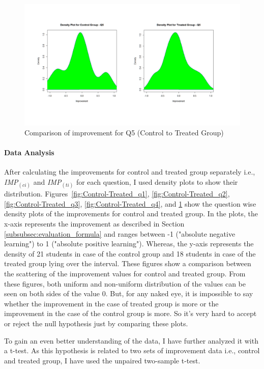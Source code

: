 \begin{figure}
	\centering
	\includegraphics[width=1\textwidth]{figures/Control-Treated_q5}
	\caption{Comparison of improvement for Q5 (Control to Treated Group)}
	\label{fig:Control-Treated_q5}
\end{figure}

\paragraph{Data Analysis}
After calculating the improvements for control and treated group separately i.e., \textit{IMP$_{(ci)}$} and \textit{IMP$_{(ti)}$} for each question, I used density plots to show their distribution. Figures~\ref{fig:Control-Treated_q1}, \ref{fig:Control-Treated_q2}, \ref{fig:Control-Treated_q3}, \ref{fig:Control-Treated_q4}, and \ref{fig:Control-Treated_q5} show the question wise density plots of the improvements for control and treated group. In the plots, the x-axis represents the improvement as described in Section \ref{subsubsec:evaluation_formula} and ranges between -1 ("absolute negative learning") to 1 ("absolute positive learning"). Whereas, the y-axis represents the density of 21 students in case of the control group and 18 students in case of the treated group lying over the interval. These figures show a comparison between the scattering of the improvement values for control and treated group. From these figures, both uniform and non-uniform distribution of the values can be seen on both sides of the value 0. But, for any naked eye, it is impossible to say whether the improvement in the case of treated group is more or the improvement in the case of the control group is more. So it's very hard to accept or reject the null hypothesis just by comparing these plots.

To gain an even better understanding of the data, I have further analyzed it with a t-test. As this hypothesis is related to two sets of improvement data i.e., control and treated group, I have used the unpaired two-sample t-test.   

